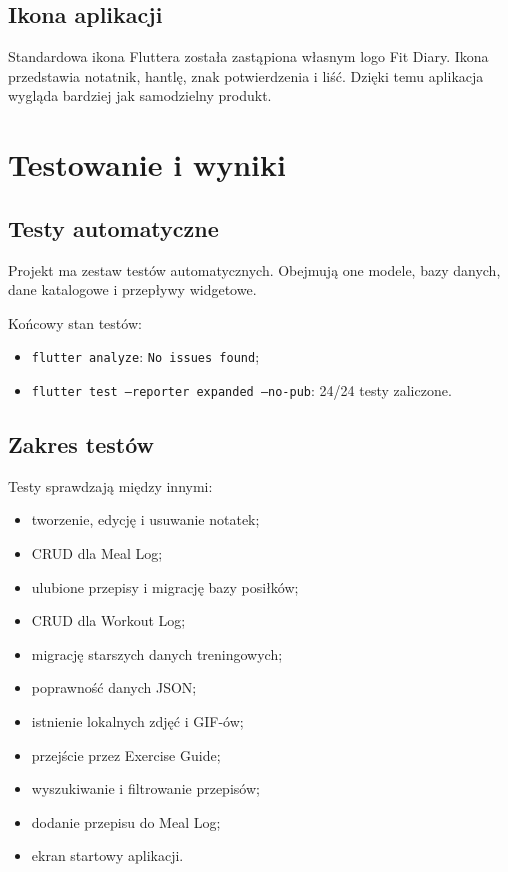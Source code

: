 \documentclass[12pt,a4paper]{article}
\begin{document}
\subsection{Ikona aplikacji}

Standardowa ikona Fluttera została zastąpiona własnym logo Fit Diary. Ikona przedstawia notatnik, hantlę, znak potwierdzenia i liść. Dzięki temu aplikacja wygląda bardziej jak samodzielny produkt.

\section{Testowanie i wyniki}

\subsection{Testy automatyczne}

Projekt ma zestaw testów automatycznych. Obejmują one modele, bazy danych, dane katalogowe i przepływy widgetowe.

Końcowy stan testów:

\begin{itemize}
    \item \texttt{flutter analyze}: \texttt{No issues found};
    \item \texttt{flutter test --reporter expanded --no-pub}: 24/24 testy zaliczone.
\end{itemize}

\subsection{Zakres testów}

Testy sprawdzają między innymi:

\begin{itemize}
    \item tworzenie, edycję i usuwanie notatek;
    \item CRUD dla Meal Log;
    \item ulubione przepisy i migrację bazy posiłków;
    \item CRUD dla Workout Log;
    \item migrację starszych danych treningowych;
    \item poprawność danych JSON;
    \item istnienie lokalnych zdjęć i GIF-ów;
    \item przejście przez Exercise Guide;
    \item wyszukiwanie i filtrowanie przepisów;
    \item dodanie przepisu do Meal Log;
    \item ekran startowy aplikacji.
\end{itemize}
\end{document}
